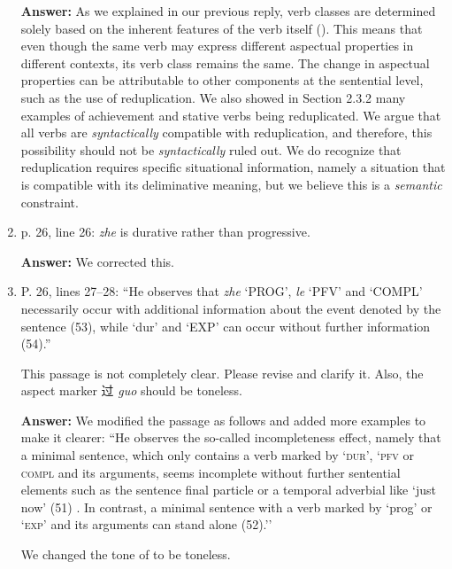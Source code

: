 \documentclass[fleqn,twoside]{article}
\begin{document}
\begin{enumerate}
\noindent
\textbf{Answer:} As we explained in our previous reply, 
verb classes are determined solely based on 
the inherent features of the verb itself
(\citealt[52]{XiaoMcEnery2004}).
This means that even though the same verb may express different aspectual properties in different contexts,
its verb class remains the same.
The change in aspectual properties can be attributable to other components at the sentential level, such as the use of reduplication.
We also showed in Section 2.3.2 many examples of achievement and stative verbs being reduplicated.
We argue that all verbs are \textit{syntactically} compatible with reduplication, 
and therefore, this possibility should not be \textit{syntactically} ruled out.
We do recognize that reduplication requires specific situational information, 
namely a situation that is compatible with its deliminative meaning,
but we believe this is a \textit{semantic} constraint.


\item p. 26, line 26: \textit{zhe} is durative rather than progressive.


\noindent
\textbf{Answer:} We corrected this.

\item P. 26, lines 27--28: ``He observes that \textit{zhe} `PROG', \textit{le} `PFV' and  `COMPL' necessarily occur
with additional information about the event denoted by the sentence (53), while  `dur' and 
`EXP' can occur without further information (54).''

This passage is not completely clear. Please revise and clarify it. Also, the aspect marker 过 \textit{guo}
should be toneless.

\noindent
\textbf{Answer:} We modified the passage as follows and added more examples to make it clearer: 
``He observes the so-called incompleteness effect, namely that a minimal sentence, 
which only contains a verb marked by  `\textsc{dur}',
 `\textsc{pfv} or  \textsc{compl} 
and its arguments, 
seems incomplete without further sentential elements 
such as the sentence final particle  
or a temporal adverbial like  `just now' (51) . 
In contrast, a minimal sentence with a verb marked by   `prog' or 
`\textsc{exp}'  and its arguments can stand alone (52).''

We changed the tone of  to be toneless.



\end{enumerate}
\end{document}
